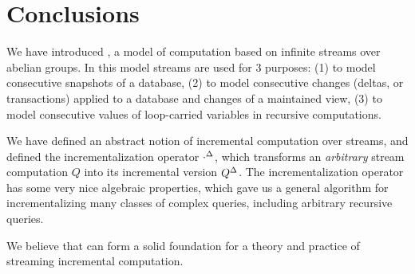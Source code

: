 \section{Conclusions}\label{sec:conclusions}%

We have introduced \dbsp, a model of computation based on 
infinite streams over abelian groups.  In this model streams are used for 3 purposes:
(1) to model consecutive snapshots of a database, (2) to model consecutive changes (deltas,
or transactions) applied to a database and changes of a maintained view, (3) to model consecutive values of loop-carried variables in recursive computations.

We have defined an abstract notion of incremental computation over streams, 
and defined the incrementalization operator
${\cdot}^{\Delta}$, which transforms an \emph{arbitrary} stream computation $Q$ 
into its incremental version ${Q}^{\Delta}$.
The incrementalization operator has some very nice algebraic properties, which
gave us a general algorithm for incrementalizing many classes of complex queries,
including arbitrary recursive queries.

We believe that \dbsp can form a solid foundation for a theory and practice of 
streaming incremental computation.